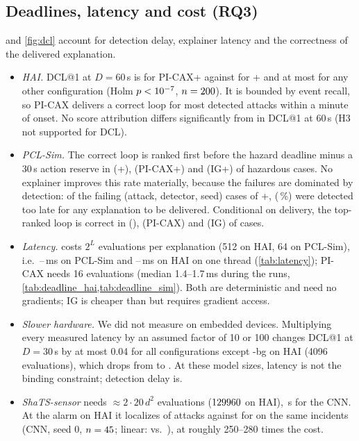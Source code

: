 \subsection{Deadlines, latency and cost (RQ3)}
 and \cref{fig:dcl} account for detection delay, explainer latency and the correctness of the delivered explanation.
\begin{itemize}
\item \emph{HAI.} DCL@1 at $D=60$\,s is \dclhaiPICAXdclfixedSixZerotea{} for PI-CAX+\TEA{} against \dclhaiLXdclfixedSixZerotea{} for \LX+\TEA{} and at most \dclhaiIGdclfixedSixZerotea{} for any other configuration (Holm $p<10^{-7}$, $n=200$). It is bounded by event recall, so PI-CAX delivers a correct loop for most detected attacks within a minute of onset. No score attribution differs significantly from \LX{} in DCL@1 at 60\,s (H3 not supported for DCL).
\item \emph{PCL-Sim.} The correct loop is ranked first before the hazard deadline minus a 30\,s action reserve in \dclsimLXdclhazhztea{} (\LX+\TEA), \dclsimPICAXdclhazhztea{} (PI-CAX+\TEA) and \dclsimIGdclhazhztea{} (IG+\TEA) of hazardous cases. No explainer improves this rate materially, because the failures are dominated by detection: of the \intimeFail{} failing (attack, detector, seed) cases of \LX+\TEA, \intimeFailUndelivered{} (\intimeFailUndeliveredPct\,\%) were detected too late for any explanation to be delivered. Conditional on delivery, the top-ranked loop is correct in \intimeDeliveredLX{} (\LX), \intimeDeliveredPICAX{} (PI-CAX) and \intimeDeliveredIG{} (IG) of cases.
\item \emph{Latency.} \LX{} costs $2^L$ evaluations per explanation (512 on HAI, 64 on PCL-Sim), i.e.\ \latsimLXlinear--\latsimLXcnn\,ms on PCL-Sim and \lathaiLXlinear--\lathaiLXcnn\,ms on HAI on one thread (\cref{tab:latency}); PI-CAX needs 16 evaluations (median 1.4--1.7\,ms during the runs, \cref{tab:deadline_hai,tab:deadline_sim}). Both are deterministic and need no gradients; IG is cheaper than \LX{} but requires gradient access.
\item \emph{Slower hardware.} We did not measure on embedded devices. Multiplying every measured latency by an assumed factor of 10 or 100 changes DCL@1 at $D=30$\,s by at most 0.04 for all configurations except \LX-bg on HAI (4096 evaluations), which drops from \slowhaixoneLXbgthirty{} to \slowhaixhundredLXbgthirty. At these model sizes, latency is not the binding constraint; detection delay is.
\item \emph{ShaTS-sensor} needs $\approx\!2\cdot20\,d^2$ evaluations ($129960$ on HAI), \lathaiShaTScnn\,s for the CNN. At the alarm on HAI it localizes \shatshaicnnHR{} of attacks against \shatshaicnnLXHR{} for \LX{} on the same incidents (CNN, seed 0, $n=45$; linear: \shatshailinearHR{} vs.\ \shatshailinearLXHR), at roughly 250--280 times the cost.
\end{itemize}

